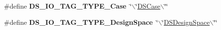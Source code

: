 \begin{DoxyCompactItemize}
\item 
\hypertarget{group___d_s___i_o___t_a_g___t_y_p_e_s_gab40a361af4d08bed8503c9a681f5a51a}{
\#define {\bfseries DS\_\-IO\_\-TAG\_\-TYPE\_\-Case}~\char`\"{}$\backslash$\char`\"{}\hyperlink{struct_d_s_case}{DSCase}$\backslash$\char`\"{}\char`\"{}}
\label{group___d_s___i_o___t_a_g___t_y_p_e_s_gab40a361af4d08bed8503c9a681f5a51a}

\item 
\hypertarget{group___d_s___i_o___t_a_g___t_y_p_e_s_ga4f6f8a8ee7b2387292daf78f6b5fe7ef}{
\#define {\bfseries DS\_\-IO\_\-TAG\_\-TYPE\_\-DesignSpace}~\char`\"{}$\backslash$\char`\"{}\hyperlink{struct_d_s_design_space}{DSDesignSpace}$\backslash$\char`\"{}\char`\"{}}
\label{group___d_s___i_o___t_a_g___t_y_p_e_s_ga4f6f8a8ee7b2387292daf78f6b5fe7ef}

\end{DoxyCompactItemize}
